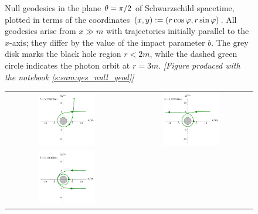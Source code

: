 \begin{figure}
\begin{tabular}{cc}
\end{tabular}
\caption[]{\label{f:gis:null_b1} \footnotesize
Null geodesics in the plane $\theta=\pi/2$ of Schwarzschild spacetime,
plotted in terms of the coordinates $(x,y) := (r\cos\varphi, r\sin\varphi)$.
All geodesics arise from $x\gg m$ with trajectories initially parallel to the $x$-axis;
they differ by the value of the impact parameter $b$.
The grey disk marks the black hole
region $r<2m$, while the dashed green circle indicates the photon orbit
at $r=3m$.
\textsl{[Figure produced with the notebook \ref{s:sam:ges_null_geod}]}
}
\end{figure}

\begin{figure}
\begin{tabular}{cc}
\includegraphics[width=0.48\textwidth]{ges_null_b_5_230000.pdf} &
\includegraphics[width=0.48\textwidth]{ges_null_b_5_202500.pdf} \\
\includegraphics[width=0.48\textwidth]{ges_null_b_5_196430.pdf} &

\end{tabular}
\end{figure}
